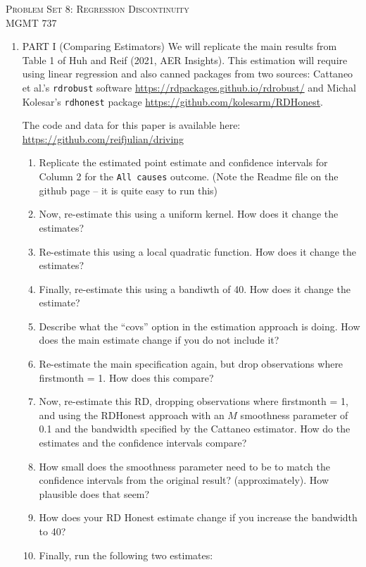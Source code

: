 \documentclass[11pt, a4paper]{article}
\begin{document}
\begin{center}
  {\Large \textsc{Problem Set 8: Regression Discontinuity}}\\
  MGMT 737
\end{center}
\begin{enumerate}
\item PART I (Comparing Estimators) We will replicate the main results
  from Table 1 of Huh and Reif (2021, AER Insights). This estimation
  will require using linear regression and also canned packages from
  two sources: Cattaneo et al.'s \texttt{rdrobust} software
  \url{https://rdpackages.github.io/rdrobust/} and Michal Kolesar's
  \texttt{rdhonest} package \url{https://github.com/kolesarm/RDHonest}.

  The code and data for this paper is available here: \url{https://github.com/reifjulian/driving}
  \begin{enumerate}
  \item Replicate the estimated point estimate and confidence
    intervals for Column 2 for the \texttt{All causes}
    outcome. (Note the Readme file on the github page -- it is quite
    easy to run this)
  \item Now, re-estimate this using a uniform kernel. How does it
    change the estimates?
  \item Re-estimate this using a local quadratic function. How does it
    change the estimates?
  \item Finally, re-estimate this using a bandiwth of 40. How does it
    change the estimate? 
  \item Describe what the ``covs'' option in the estimation approach
    is doing. How does the main estimate change if you do not include
    it?
  \item Re-estimate the main specification again, but drop
    observations where firstmonth = 1. How does this compare?
  \item Now, re-estimate this RD, dropping observations where
    firstmonth = 1, and using the RDHonest approach with an $M$
    smoothness parameter of 0.1 and the bandwidth specified by the
    Cattaneo estimator. How do the estimates and the confidence
    intervals compare?
  \item How small does the smoothness parameter need to be to match
    the confidence intervals from the original result?
    (approximately). How plausible does that seem?
  \item How does your RD Honest estimate change if you increase the
    bandwidth to 40?
  \item Finally, run the following two estimates:

\end{enumerate}
\end{enumerate}
\end{document}
